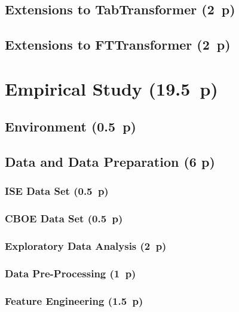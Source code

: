 \subsection{Extensions to TabTransformer (2~p)}\label{sec:extensions-to-tabtransformer}

\subsection{Extensions to FTTransformer (2~p)}\label{sec:extensions-to-fttransformer}


\newpage
\section{Empirical Study (19.5~p)}\label{sec:empirical-study}

\subsection{Environment (0.5~p)}\label{sec:environment}

\subsection{Data and Data Preparation (6 p)}\label{sec:data-and-data-preparation}

\subsubsection{ISE Data Set (0.5~p)}\label{sec:ise-data-set}

\subsubsection{CBOE Data Set (0.5~p)}\label{sec:cboe-data-set}

\subsubsection{Exploratory Data Analysis (2~p)}\label{sec:exploratory-data-analysis}

\subsubsection{Data Pre-Processing (1~p)}\label{sec:data-preprocessing}

\subsubsection{Feature Engineering (1.5~p)}\label{sec:feature-engineering}

